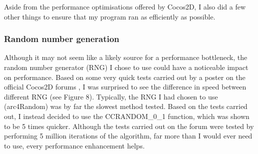 \documentclass[a4paper,oneside]{report}
\begin{document}
Aside from the performance optimisations offered by Cocos2D, I also did a few other things to ensure that my program ran as efficiently as possible.

\subsubsection{Random number generation} 

Although it may not seem like a likely source for a performance bottleneck, the random number generator (RNG) I chose to use could have a noticeable impact on performance. Based on some very quick tests carried out by a poster on the official Cocos2D forums \cite{:2011zt}, I was surprised to see the difference in speed between different RNG (see Figure 8). Typically, the RNG I had chosen to use (arc4Random) was by far the slowest method tested. Based on the tests carried out, I instead decided to use the CCRANDOM\_0\_1 function, which was shown to be 5 times quicker. Although the tests carried out on the forum were tested by performing 5 million iterations of the algorithm, far more than I would ever need to use, every performance enhancement helps.
	
\end{document}
